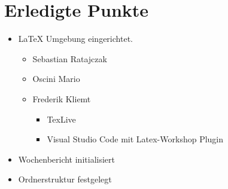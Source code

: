 \section{Erledigte Punkte}

\begin{itemize}
  \item \LaTeX{} Umgebung eingerichtet.
  \begin{itemize}
    \item Sebastian Ratajczak
    \item Oscini Mario
    \item Frederik Kliemt
    \begin{itemize}
      \item TexLive
      \item Visual Studio Code mit Latex-Workshop Plugin
    \end{itemize}
  \end{itemize}
  \item Wochenbericht initialisiert
  \item Ordnerstruktur festgelegt
\end{itemize}

